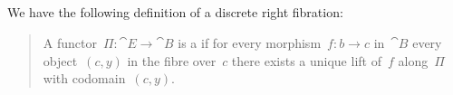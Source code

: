 \subsection{}

We have the following definition of a discrete right fibration:
\begin{quote}
	A functor~$Π \colon \cat{E} \to \cat{B}$ is a  if for every morphism~$f \colon b \to c$ in~$\cat{B}$ every object~$(c, y)$ in the fibre over~$c$ there exists a unique lift of~$f$ along~$Π$ with codomain~$(c, y)$.
\end{quote}
